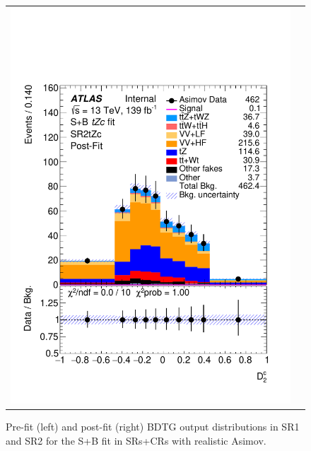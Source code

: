 \begin{figure}[htbp]
\begin{tabular}{cc}
		\includegraphics[width=.45\textwidth]{Appendices/AP9/figures/SPLUSB_CRSR_UsingBaseFullSys/Plots/SR2_postFit} \\
	\end{tabular}
	\caption{Pre-fit (left) and post-fit (right) BDTG output distributions in SR1 and SR2 for the S+B \tZc fit in SRs+CRs with realistic Asimov.
		\ErrStatSys
	}%
	\label{fig:stat:tzc:splusb:crsr:srplots:1_base}
\end{figure}

